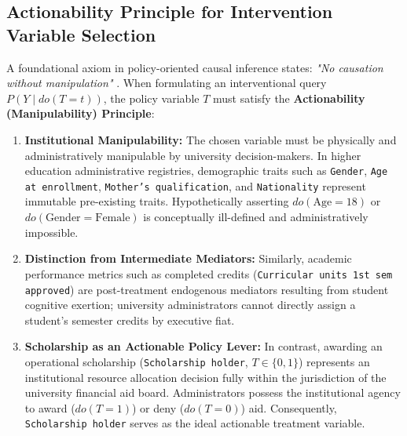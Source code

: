 \subsection{Actionability Principle for Intervention Variable Selection}
A foundational axiom in policy-oriented causal inference states: \emph{"No causation without manipulation"} \parencite{hernan2020causal, pearl2009causality}. When formulating an interventional query $P(Y \mid do(T=t))$, the policy variable $T$ must satisfy the \textbf{Actionability (Manipulability) Principle}:
\begin{enumerate}
    \item \textbf{Institutional Manipulability:} The chosen variable must be physically and administratively manipulable by university decision-makers. In higher education administrative registries, demographic traits such as \texttt{Gender}, \texttt{Age at enrollment}, \texttt{Mother's qualification}, and \texttt{Nationality} represent immutable pre-existing traits. Hypothetically asserting $do(\text{Age}=18)$ or $do(\text{Gender}=\text{Female})$ is conceptually ill-defined and administratively impossible.
    \item \textbf{Distinction from Intermediate Mediators:} Similarly, academic performance metrics such as completed credits (\texttt{Curricular units 1st sem approved}) are post-treatment endogenous mediators resulting from student cognitive exertion; university administrators cannot directly assign a student's semester credits by executive fiat.
    \item \textbf{Scholarship as an Actionable Policy Lever:} In contrast, awarding an operational scholarship (\texttt{Scholarship holder}, $T \in \{0, 1\}$) represents an institutional resource allocation decision fully within the jurisdiction of the university financial aid board. Administrators possess the institutional agency to award ($do(T=1)$) or deny ($do(T=0)$) aid. Consequently, \texttt{Scholarship holder} serves as the ideal actionable treatment variable.
\end{enumerate}
